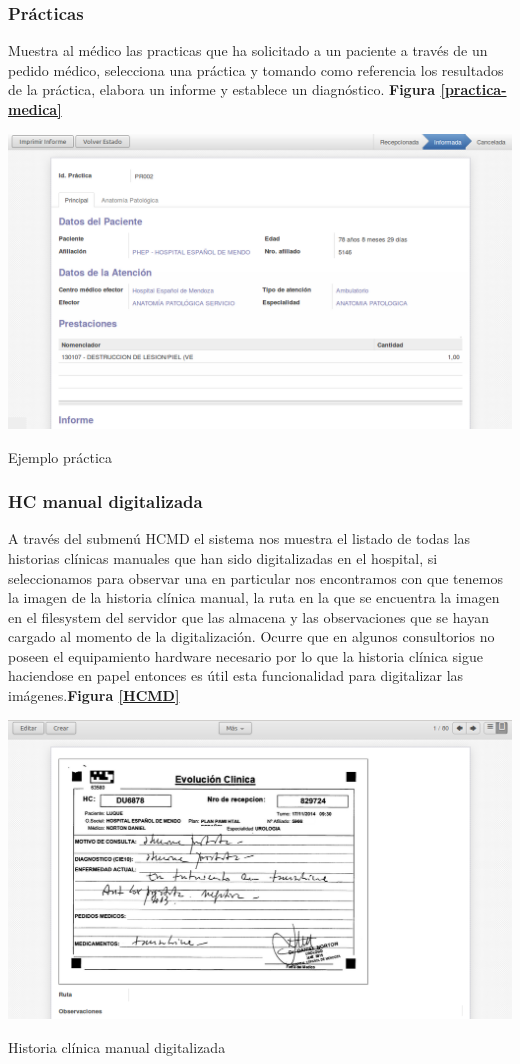 {\correccionTexto
\subsubsection{Prácticas}
Muestra al médico las practicas que ha solicitado a un paciente a través de un pedido médico, selecciona una práctica y tomando como referencia los resultados de la práctica, elabora un informe y establece un diagnóstico.
\textbf{Figura \ref{practica-medica}}}

\begin{correccionFigure}
      \centering
      \includegraphics[width=.8\textwidth]{img/tp1/HE/Practica1}
      \caption{Ejemplo práctica}
      \label{practica-medica}
\end{correccionFigure}

{\correccionTexto
\subsubsection{HC manual digitalizada}
A través del submenú HCMD el sistema nos muestra el listado de todas las historias clínicas manuales que han sido digitalizadas en el hospital, si seleccionamos para observar una en particular nos encontramos con que tenemos la imagen de la historia clínica manual, la ruta en la que se encuentra la imagen en el filesystem del servidor que las almacena y las observaciones que se hayan cargado al momento de la digitalización.
Ocurre que en algunos consultorios no poseen el equipamiento hardware necesario por lo que la historia clínica sigue haciendose en papel entonces es útil esta funcionalidad para digitalizar las imágenes.\textbf{Figura \ref{HCMD}}}

\begin{correccionFigure}[ht]
      \centering
      \includegraphics[width=.8\textwidth]{img/tp1/HE/HCMDmanualdigital}
      \caption{Historia clínica manual digitalizada}
      \label{HCMD}
\end{correccionFigure}

